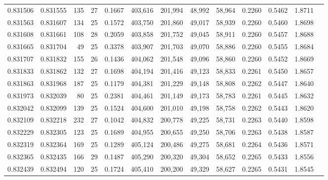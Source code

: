 \begin{tabular}{rrrrrrrrrrrrr}
0.831506 & 0.831555 &   135 &  27 &                                     0.1667 & 403,616 & 201,994 &  48,992 &  58,964 & 0.2260 & 0.5462 & 1.8711 \\
0.831563 & 0.831607 &   134 &  25 &                                     0.1572 & 403,750 & 201,860 &  49,017 &  58,939 & 0.2260 & 0.5460 & 1.8698 \\
0.831608 & 0.831661 &   108 &  28 &                                     0.2059 & 403,858 & 201,752 &  49,045 &  58,911 & 0.2260 & 0.5457 & 1.8688 \\
0.831665 & 0.831704 &    49 &  25 &                                     0.3378 & 403,907 & 201,703 &  49,070 &  58,886 & 0.2260 & 0.5455 & 1.8684 \\
0.831707 & 0.831832 &   155 &  26 &                                     0.1436 & 404,062 & 201,548 &  49,096 &  58,860 & 0.2260 & 0.5452 & 1.8669 \\
0.831833 & 0.831862 &   132 &  27 &                                     0.1698 & 404,194 & 201,416 &  49,123 &  58,833 & 0.2261 & 0.5450 & 1.8657 \\
0.831863 & 0.831968 &   187 &  25 &                                     0.1179 & 404,381 & 201,229 &  49,148 &  58,808 & 0.2262 & 0.5447 & 1.8640 \\
0.831973 & 0.832039 &    80 &  25 &                                     0.2381 & 404,461 & 201,149 &  49,173 &  58,783 & 0.2261 & 0.5445 & 1.8632 \\
0.832042 & 0.832099 &   139 &  25 &                                     0.1524 & 404,600 & 201,010 &  49,198 &  58,758 & 0.2262 & 0.5443 & 1.8620 \\
0.832109 & 0.832218 &   232 &  27 &                                     0.1042 & 404,832 & 200,778 &  49,225 &  58,731 & 0.2263 & 0.5440 & 1.8598 \\
0.832229 & 0.832305 &   123 &  25 &                                     0.1689 & 404,955 & 200,655 &  49,250 &  58,706 & 0.2263 & 0.5438 & 1.8587 \\
0.832319 & 0.832364 &   169 &  25 &                                     0.1289 & 405,124 & 200,486 &  49,275 &  58,681 & 0.2264 & 0.5436 & 1.8571 \\
0.832365 & 0.832435 &   166 &  29 &                                     0.1487 & 405,290 & 200,320 &  49,304 &  58,652 & 0.2265 & 0.5433 & 1.8556 \\
0.832439 & 0.832494 &   120 &  25 &                                     0.1724 & 405,410 & 200,200 &  49,329 &  58,627 & 0.2265 & 0.5431 & 1.8545 \\

\end{tabular}
